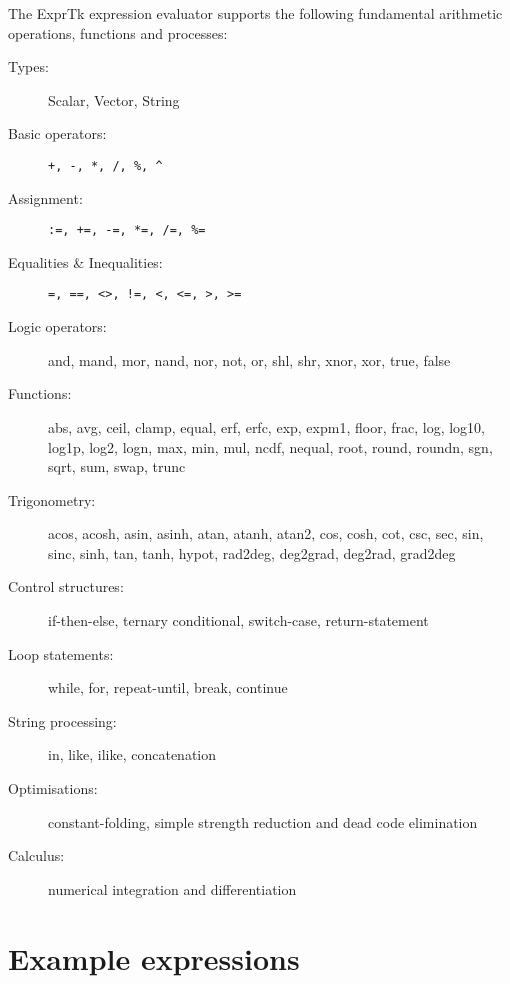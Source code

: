 The ExprTk expression evaluator supports the following fundamental
arithmetic operations, functions and processes:
\begin{description}
\item [{Types:}] Scalar, Vector, String
\item [{Basic operators:}] \verb'+, -, *, /, %, ^'
\item [{Assignment:}] \verb':=, +=, -=, *=, /=, %='
\item [{Equalities \& Inequalities:}] \verb'=, ==, <>, !=, <, <=, >, >='
\item [{Logic operators:}] and, mand, mor, nand, nor, not, or, shl, shr,
xnor, xor, true, false
\item [{Functions:}] abs, avg, ceil, clamp, equal, erf, erfc, exp, expm1,
floor, frac, log, log10, log1p, log2, logn, max, min, mul, ncdf, nequal,
root, round, roundn, sgn, sqrt, sum, swap, trunc
\item [{Trigonometry:}] acos, acosh, asin, asinh, atan, atanh, atan2, cos,
cosh, cot, csc, sec, sin, sinc, sinh, tan, tanh, hypot, rad2deg, deg2grad,
deg2rad, grad2deg
\item [{Control structures:}] if-then-else, ternary conditional, switch-case,
return-statement
\item [{Loop statements:}] while, for, repeat-until, break, continue
\item [{String processing:}] in, like, ilike, concatenation
\item [{Optimisations:}] constant-folding, simple strength reduction and
dead code elimination
\item [{Calculus:}] numerical integration and differentiation
\end{description}

\section{Example expressions}

